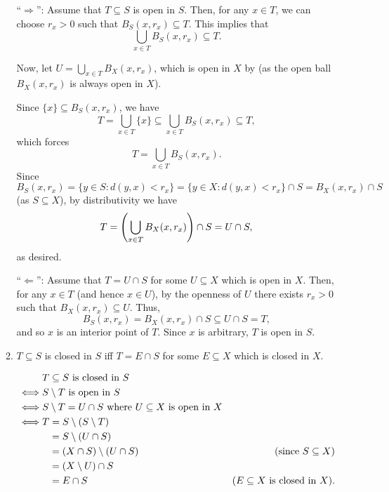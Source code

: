 \begin{enumerate}
\begin{enumerate}
\begin{pf}
``\(\Rightarrow\)'': Assume that \(T\subseteq S\) is open in \(S\). Then, for
any \(x\in T\), we can choose \(r_x>0\) such that \(B_S(x,r_x)\subseteq T\).
This implies that
\[
\bigcup_{x\in T}B_S(x, r_x)\subseteq T.
\]

Now, let \(U=\bigcup_{x\in T}B_X(x,r_x)\), which is open
in \(X\) by  (as the open ball
\(B_X(x,r_x)\) is always open in \(X\)).

Since \(\{x\}\subseteq B_S(x,r_x)\), we have
\[
T=\bigcup_{x\in T}\{x\}\subseteq \bigcup_{x\in T}B_S(x, r_x)\subseteq T,
\]
which forces
\[
T=\bigcup_{x\in T}B_S(x, r_x).
\]
Since \(B_S(x,r_x)=\{y\in S:d(y,x)<r_x\}=\{y\in X:d(y,x)<r_x\}\cap
S=B_X(x,r_x)\cap S\) (as \(S\subseteq X\)), by distributivity we have
\[
T=\qty(\bigcup_{x\in T}B_X(x,r_x))\cap S=U\cap S,
\]
as desired.

``\(\Leftarrow\)'': Assume that \(T=U\cap S\) for some \(U\subseteq X\) which
is open in \(X\). Then, for any \(x\in T\) (and hence \(x\in U\)), by the
openness of \(U\) there exists \(r_x>0\) such that \(B_X(x,r_x)\subseteq U\).
Thus,
\[
B_S(x,r_x)=B_X(x,r_x)\cap S\subseteq U\cap S=T,
\]
and so \(x\) is an interior point of \(T\). Since \(x\) is arbitrary, \(T\) is
open in \(S\).
\end{pf}
\item \(T\subseteq S\) is closed in \(S\) iff \(T=E\cap S\) for some
\(E\subseteq X\) which is closed in \(X\).

\begin{pf}
\begin{align*}
&\text{\(T\subseteq S\) is closed in \(S\)}\\
\iff &\text{\(S\setminus T\) is open in \(S\)}\\
\iff &\text{\(S\setminus T=U\cap S\) where \(U\subseteq X\) is open in \(X\)}\\
\iff &T=S\setminus(S\setminus T)\\
&\hspace{0.25cm}=S\setminus(U\cap S)\\
&\hspace{0.25cm}=(X\cap S)\setminus(U\cap S)&\text{(since \(S\subseteq X\))}\\
&\hspace{0.25cm}=(X\setminus U)\cap S\\
&\hspace{0.25cm}=E\cap S&\text{(\(E\subseteq X\) is closed in \(X\))}.
\end{align*}
\end{pf}
\end{enumerate}


\end{enumerate}
